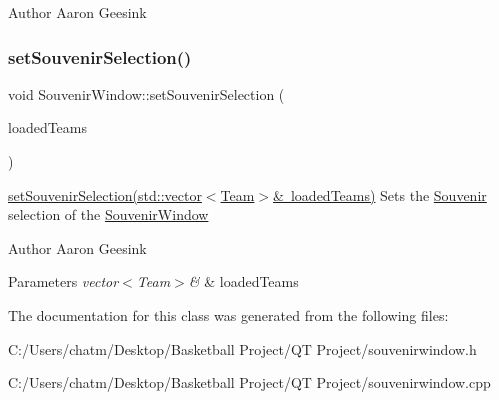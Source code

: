 \begin{DoxyAuthor}{Author}
Aaron Geesink 
\end{DoxyAuthor}
\mbox{\label{class_souvenir_window_a1ded9a4ba9dd58b0f6dad72917b558b2}} 
\subsubsection{\texorpdfstring{setSouvenirSelection()}{setSouvenirSelection()}}
{\footnotesize\ttfamily void Souvenir\+Window\+::set\+Souvenir\+Selection (\begin{DoxyParamCaption}\item[{std\+::vector$<$ \mbox{\hyperlink{class_team}{Team}} $>$ \&}]{loaded\+Teams }\end{DoxyParamCaption})}



\mbox{\hyperlink{class_souvenir_window_a1ded9a4ba9dd58b0f6dad72917b558b2}{set\+Souvenir\+Selection(std\+::vector$<$\+Team$>$\& loaded\+Teams)}} Sets the \mbox{\hyperlink{class_souvenir}{Souvenir}} selection of the \mbox{\hyperlink{class_souvenir_window}{Souvenir\+Window}} 

\begin{DoxyAuthor}{Author}
Aaron Geesink 
\end{DoxyAuthor}

\begin{DoxyParams}{Parameters}
{\em vector$<$\+Team$>$\&} & loaded\+Teams \\
\hline
\end{DoxyParams}


The documentation for this class was generated from the following files\+:\begin{DoxyCompactItemize}
\item 
C\+:/\+Users/chatm/\+Desktop/\+Basketball Project/\+Q\+T Project/souvenirwindow.\+h\item 
C\+:/\+Users/chatm/\+Desktop/\+Basketball Project/\+Q\+T Project/souvenirwindow.\+cpp\end{DoxyCompactItemize}
